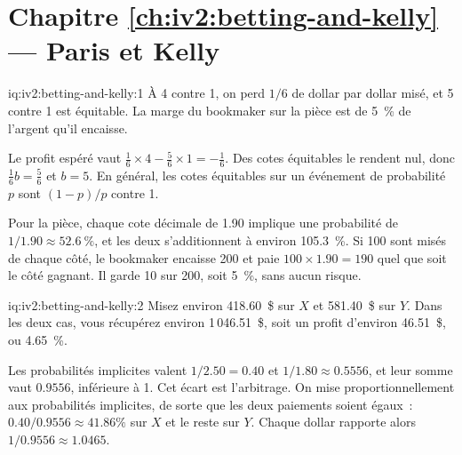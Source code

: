 \section*{Chapitre \ref{ch:iv2:betting-and-kelly} --- Paris et Kelly}

\begin{solution}{iq:iv2:betting-and-kelly:1}
À 4 contre 1, on perd $1/6$ de dollar par dollar misé, et 5 contre 1 est équitable. La marge du bookmaker sur la pièce est de 5~\% de l'argent qu'il encaisse.

Le profit espéré vaut $\tfrac16 \times 4 - \tfrac56 \times 1 = -\tfrac16$. Des cotes équitables le rendent nul, donc $\tfrac16 b = \tfrac56$ et $b = 5$. En général, les cotes équitables sur un événement de probabilité $p$ sont $(1 - p)/p$ contre 1.

Pour la pièce, chaque cote décimale de 1.90 implique une probabilité de $1/1.90 \approx 52.6~\%$, et les deux s'additionnent à environ 105.3~\%. Si 100 sont misés de chaque côté, le bookmaker encaisse 200 et paie $100 \times 1.90 = 190$ quel que soit le côté gagnant. Il garde 10 sur 200, soit 5~\%, sans aucun risque.

\end{solution}

\begin{solution}{iq:iv2:betting-and-kelly:2}
Misez environ 418.60~\$ sur $X$ et 581.40~\$ sur $Y$. Dans les deux cas, vous récupérez environ 1\,046.51~\$, soit un profit d'environ 46.51~\$, ou 4.65~\%.

Les probabilités implicites valent $1/2.50 = 0.40$ et $1/1.80 \approx 0.5556$, et leur somme vaut $0.9556$, inférieure à 1. Cet écart est l'arbitrage. On mise proportionnellement aux probabilités implicites, de sorte que les deux paiements soient égaux~: $0.40/0.9556 \approx 41.86\%$ sur $X$ et le reste sur $Y$. Chaque dollar rapporte alors $1/0.9556 \approx 1.0465$.

\end{solution}

